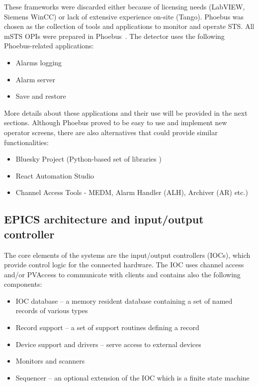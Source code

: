  These frameworks were discarded either because of licensing needs (LabVIEW, Siemens WinCC) or lack of extensive experience on-site (Tango). Phoebus \cite{Phoebus} was chosen as the collection of tools and applications to monitor and operate \gls{STS}. All \gls{mSTS} \glspl{OPI} were prepared in Phoebus~\cite{Phoebus}. The detector uses the following Phoebus-related applications:
\begin{itemize}
    \item Alarms logging
    \item Alarm server
    \item Save and restore
\end{itemize}
More details about these applications and their use will be provided in the next sections. Although Phoebus proved to be easy to use and implement new operator screens, there are also alternatives that could provide similar functionalities:
\begin{itemize}
    \item Bluesky Project (Python-based set of libraries \cite{Bluesky})
    \item React Automation Studio \cite{React}
    \item Channel Access Tools - MEDM, Alarm Handler (\gls{ALH}), Archiver (\gls{AR}) etc.) 
\end{itemize}

\subsection{EPICS architecture and input/output controller}
The core elements of the systems are the input/output controllers (\glspl{IOC}), which provide control logic for the connected hardware. The \gls{IOC} uses channel access and/or PVAccess to communicate with clients and contains also the following components\cite{IOC}:
\begin{itemize}
    \item \gls{IOC} database -- a memory resident database containing a set of named records of various types \cite{IOC2}
    \item Record support -- a set of support routines defining a record
    \item Device support and drivers -- serve access to external devices
    \item Monitors and scanners
    \item Sequencer -- an optional extension of the \gls{IOC} which is a finite state machine
\end{itemize}

